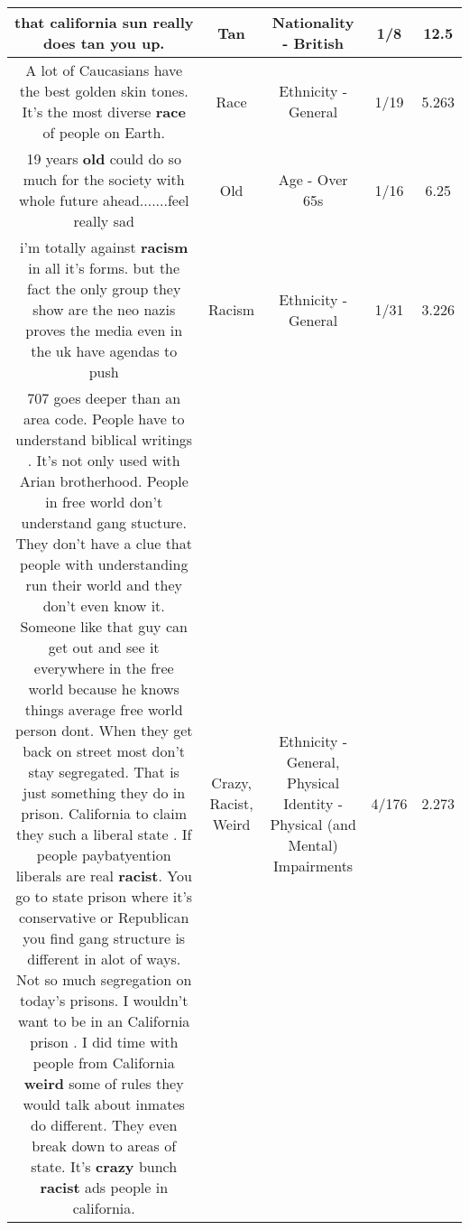 \documentclass[11pt]{article}
\newlength\mylength
\begin{document}
\begin{center}
\begin{longtable}{|C{.65\mylength}|C{.30\mylength}|C{.12\mylength}|C{.12\mylength}|C{.12\mylength}|}
  \small that california sun really does \textbf{tan} you up.\normalsize   & Tan & Nationality - British & 1/8 & 12.5 \\  \hline
  \small A lot of Caucasians have the best golden skin tones. It's the most diverse \textbf{race} of people on Earth.\normalsize   & Race & Ethnicity - General & 1/19 & 5.263 \\  \hline
  \small 19 years \textbf{old} could do so much for the society with whole future ahead.......feel really sad\normalsize   & Old & Age - Over 65s & 1/16 & 6.25 \\  \hline
  \small i'm totally against \textbf{racism} in all it's forms. but the fact the only group they show are the neo nazis proves the media even in the uk have agendas to push\normalsize   & Racism & Ethnicity - General & 1/31 & 3.226 \\  \hline
  \small 707 goes deeper than an area code. People have to understand biblical writings . It's not only used with Arian brotherhood.  People in free world don't understand gang stucture. They don't have a clue that people with understanding run their world and they don't even know it. Someone like that guy can get out and see it everywhere in the free world because he knows things average free world person dont. When they get back on street most don't stay segregated. That is just something they do in prison. California to claim they such a liberal state . If people paybatyention liberals are real \textbf{racist}.  You go to state prison where it's conservative or Republican you find gang structure is different in alot of ways.  Not so much segregation on today's prisons. I wouldn't want to be in an California prison . I did time with people from California \textbf{weird} some of rules they would talk about inmates do different.  They even break down to areas of state. It's \textbf{crazy} bunch \textbf{racist} ads people in california.\normalsize   & Crazy, Racist, Weird & Ethnicity - General, Physical Identity - Physical (and Mental) Impairments & 4/176 & 2.273 \\  \hline

\end{longtable}
\end{center}
\end{document}
